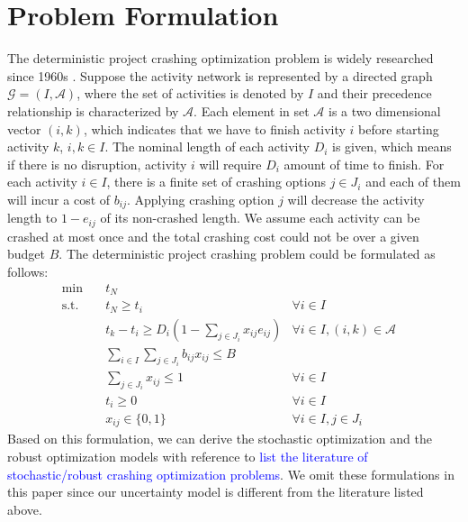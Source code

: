 \documentclass[11pt]{article}
\begin{document}
\section{Problem Formulation} \label{sec:formulation}
	The deterministic project crashing optimization problem is widely researched since 1960s \cite{fulkerson1961network, kelley1961criticalpath}. Suppose the activity network is represented by a directed graph \(\mathcal{G} = (I,\mathcal{A})\), where the set of activities is denoted by \(I\) and their precedence relationship is characterized by \(\mathcal{A}\). Each element in set \(\mathcal{A}\) is a two dimensional vector \((i,k)\), which indicates that we have to finish activity \(i\) before starting activity \(k\), \(i,k \in I\).  The nominal length of each activity \(D_i\) is given, which means if there is no disruption, activity \(i\) will require \(D_i\) amount of time to finish. For each activity \(i \in I\), there is a finite set of crashing options \(j \in J_i\) and each of them will incur a cost of \(b_{ij}\). Applying crashing option \(j\) will decrease the activity length to \(1 - e_{ij}\) of its non-crashed length. We assume each activity can be crashed at most once and the total crashing cost could not be over a given budget \(B\). The deterministic project crashing problem could be formulated as follows:
	\begin{subequations} \label{prob:static}
		\begin{align}
			\min \quad & t_N &\\
			\text{s.t.} \quad & t_N \geq t_i & \forall i \in I \label{cons:dotN}\\
			& t_k - t_i \geq D_{i}(1 - \sum_{j \in J_i} x_{ij} e_{ij}) & \forall i \in I, (i,k) \in \mathcal{A} \label{cons:dott}\\
			& \sum_{i \in I} \sum_{j \in J_i} b_{ij}x_{ij} \leq B & \label{cons:doBudget}\\
			& \sum_{j \in J_i} x_{ij} \leq 1 & \forall i \in I\\
			& t_i \geq 0 & \forall i \in I\\
			& x_{ij} \in \{0,1\} & \forall i \in I, j \in J_i&
		\end{align}
	\end{subequations}
	Based on this formulation, we can derive the stochastic optimization and the robust optimization models with reference to \textcolor{blue}{list the literature of stochastic/robust crashing optimization problems}. We omit these formulations in this paper since our uncertainty model is different from the literature listed above.\\
\end{document}
